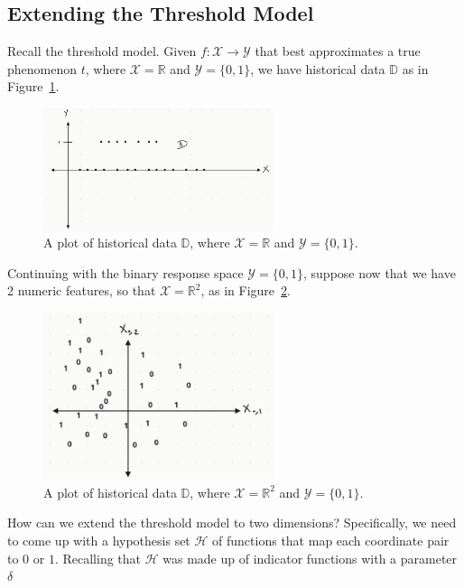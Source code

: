 \documentclass[12pt, a4paper]{article}
\theoremstyle{definition}
\begin{document}
	\subsection*{Extending the Threshold Model}
	Recall the threshold model. Given $f:\mathcal{X}\to\mathcal{Y}$ that best approximates a true
	phenomenon $t$, where $\mathcal{X} = \mathbb{R}$ and $\mathcal{Y} = \{0, 1\}$, we have
	historical data $\mathbb{D}$ as in Figure~\ref{fig:threshold-model}.
	\begin{figure}
		\centering
		\includegraphics[width=0.6\textwidth]{threshold-model}
		\caption{A plot of historical data $\mathbb{D}$, where $\mathcal{X}=\mathbb{R}$
		and $\mathcal{Y} = \{0, 1\}$.}
		\label{fig:threshold-model}
	\end{figure}
	Continuing with the binary response space $\mathcal{Y}=\{0, 1\}$, suppose now that
	we have 2 numeric features, so that $\mathcal{X}=\mathbb{R}^2$, as in
	Figure~\ref{fig:2d-threshold-model}.
	\begin{figure}
		\centering
		\includegraphics[width=0.6\textwidth]{2d-threshold-model}
		\caption{A plot of historical data $\mathbb{D}$, where $\mathcal{X}=\mathbb{R}^2$
			and $\mathcal{Y} = \{0, 1\}$.}
		\label{fig:2d-threshold-model}
	\end{figure}
	How can we extend the threshold model to two dimensions? Specifically, we need to come up
	with a hypothesis set $\mathcal{H}$ of functions that map each coordinate pair to $0$ or $1$.
	Recalling that $\mathcal{H}$ was made up of indicator functions with a parameter $\delta$
\end{document}

